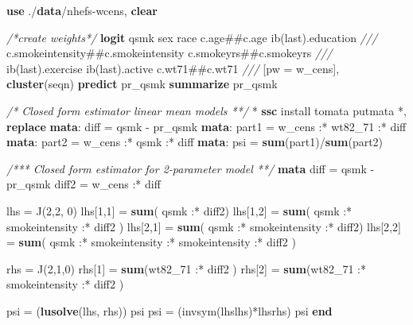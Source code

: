 \documentclass[
  10pt,
]{book}
\newenvironment{Shaded}{\begin{snugshade}}{\end{snugshade}}
\newcommand{\CommentTok}[1]{\textcolor[rgb]{0.56,0.35,0.01}{\textit{#1}}}
\newcommand{\FunctionTok}[1]{\textcolor[rgb]{0.00,0.00,0.00}{#1}}
\newcommand{\KeywordTok}[1]{\textcolor[rgb]{0.13,0.29,0.53}{\textbf{#1}}}
\newcommand{\NormalTok}[1]{#1}
\begin{document}
\begin{Shaded}
\begin{Highlighting}[]
\KeywordTok{use}\NormalTok{ ./}\KeywordTok{data}\NormalTok{/nhefs{-}wcens, }\KeywordTok{clear}

\CommentTok{/*create weights*/}
\KeywordTok{logit}\NormalTok{ qsmk sex race c.age\#\#c.age ib(}\FunctionTok{last}\NormalTok{).education }\CommentTok{///}
\NormalTok{  c.smokeintensity\#\#c.smokeintensity c.smokeyrs\#\#c.smokeyrs }\CommentTok{///}
\NormalTok{  ib(}\FunctionTok{last}\NormalTok{).exercise ib(}\FunctionTok{last}\NormalTok{).active c.wt71\#\#c.wt71 }\CommentTok{///}
\NormalTok{  [pw = w\_cens], }\KeywordTok{cluster}\NormalTok{(seqn)}
\KeywordTok{predict}\NormalTok{ pr\_qsmk}
\KeywordTok{summarize}\NormalTok{ pr\_qsmk}

\CommentTok{/* Closed form estimator linear mean models  **/}
\NormalTok{* }\KeywordTok{ssc}\NormalTok{ install tomata}
\NormalTok{putmata *, }\KeywordTok{replace}
\KeywordTok{mata}\NormalTok{: }\FunctionTok{diff}\NormalTok{ = qsmk {-} pr\_qsmk}
\KeywordTok{mata}\NormalTok{: part1 = w\_cens :* wt82\_71 :* }\FunctionTok{diff}
\KeywordTok{mata}\NormalTok{: part2 = w\_cens :* qsmk :* }\FunctionTok{diff}
\KeywordTok{mata}\NormalTok{: psi = }\KeywordTok{sum}\NormalTok{(part1)/}\KeywordTok{sum}\NormalTok{(part2)}

\CommentTok{/*** Closed form estimator for 2{-}parameter model **/}
\KeywordTok{mata}
\FunctionTok{diff}\NormalTok{ = qsmk {-} pr\_qsmk}
\NormalTok{diff2 = w\_cens :* }\FunctionTok{diff}

\NormalTok{lhs = }\FunctionTok{J}\NormalTok{(2,2, 0)}
\NormalTok{lhs[1,1] = }\KeywordTok{sum}\NormalTok{( qsmk :* diff2)}
\NormalTok{lhs[1,2] = }\KeywordTok{sum}\NormalTok{( qsmk :* smokeintensity :* diff2 )}
\NormalTok{lhs[2,1] = }\KeywordTok{sum}\NormalTok{( qsmk :* smokeintensity :* diff2)}
\NormalTok{lhs[2,2] = }\KeywordTok{sum}\NormalTok{( qsmk :* smokeintensity :* smokeintensity :* diff2 )}
                                                                
\NormalTok{rhs = }\FunctionTok{J}\NormalTok{(2,1,0)}
\NormalTok{rhs[1] = }\KeywordTok{sum}\NormalTok{(wt82\_71 :* diff2 )}
\NormalTok{rhs[2] = }\KeywordTok{sum}\NormalTok{(wt82\_71 :* smokeintensity :* diff2 )}

\NormalTok{psi = (}\KeywordTok{lusolve}\NormalTok{(lhs, rhs))\textquotesingle{}}
\NormalTok{psi}
\NormalTok{psi = (}\FunctionTok{invsym}\NormalTok{(lhs\textquotesingle{}lhs)*lhs\textquotesingle{}rhs)\textquotesingle{}}
\NormalTok{psi}
\KeywordTok{end}
\end{Highlighting}
\end{Shaded}
\end{document}
